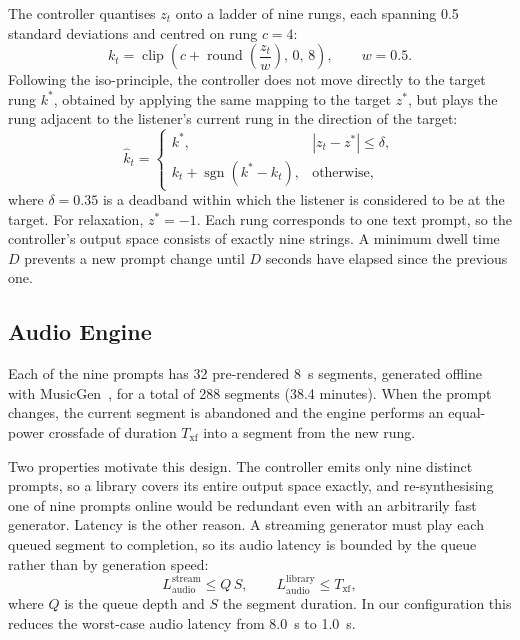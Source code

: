 \documentclass[11pt,a4paper]{article}
\begin{document}
The controller quantises $z_t$ onto a ladder of nine rungs, each spanning 0.5 standard
deviations and centred on rung $c = 4$:
\begin{equation}
  k_t = \operatorname{clip}\!\left(c + \operatorname{round}\!\left(\frac{z_t}{w}\right),
        \,0,\,8\right), \qquad w = 0.5.
\end{equation}
Following the iso-principle, the controller does not move directly to the target rung
$k^\ast$, obtained by applying the same mapping to the target $z^\ast$, but plays the rung
adjacent to the listener's current rung in the direction of the target:
\begin{equation}
  \hat{k}_t =
  \begin{cases}
    k^\ast, & |z_t - z^\ast| \le \delta, \\
    k_t + \operatorname{sgn}(k^\ast - k_t), & \text{otherwise,}
  \end{cases}
\end{equation}
where $\delta = 0.35$ is a deadband within which the listener is considered to be at the
target. For relaxation, $z^\ast = -1$.
Each rung corresponds to one text prompt, so the controller's output space consists of
exactly nine strings. A minimum dwell time $D$ prevents a new prompt change until $D$
seconds have elapsed since the previous one.

\subsection{Audio Engine}

Each of the nine prompts has 32 pre-rendered 8~s segments, generated offline with
MusicGen~\cite{musicgen}, for a total of 288 segments (38.4 minutes). When the prompt
changes, the current segment is abandoned and the engine performs an equal-power crossfade
of duration $T_{\mathrm{xf}}$ into a segment from the new rung.

Two properties motivate this design. The controller emits only nine distinct prompts, so a
library covers its entire output space exactly, and re-synthesising one of nine prompts
online would be redundant even with an arbitrarily fast generator. Latency is the other
reason. A streaming generator must play each queued segment to completion, so its audio
latency is bounded by the queue rather than by generation speed:
\begin{equation}
  L_{\mathrm{audio}}^{\mathrm{stream}} \le Q\,S, \qquad
  L_{\mathrm{audio}}^{\mathrm{library}} \le T_{\mathrm{xf}},
\end{equation}
where $Q$ is the queue depth and $S$ the segment duration. In our configuration this
reduces the worst-case audio latency from 8.0~s to 1.0~s.
\end{document}
